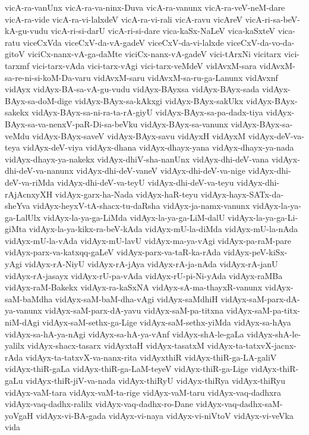 {vicA-ra-vanUnx
vicA-ra-va-ninx-Duva
vicA-ra-vanunx
vicA-ra-veV-neM-dare
vicA-ra-vide
vicA-ra-vi-lalxdeV
vicA-ra-vi-rali
vicA-ravu
vicAreV
vicA-ri-sa-beV-kA-gu-vudu
vicA-ri-si-darU
vicA-ri-si-dare
vica-kaSx-NaLeV
vica-kaSxteV
vica-ratu
viceCxVda
viceCxV-da-vA-gadeV
viceCxV-da-vi-lalxde
viceCxV-da-vo-da-gitoV
viciCx-nanx-vA-ga-daMte
viciCx-nanx-vA-gadeV
vici-tArxNi
vicitarx
vici-tarxmf
vici-tarx-vAda
vici-tarx-vAgi
vici-tarx-veMdeV
vidAvxM-sara
vidAvxM-sa-re-ni-si-koM-Da-varu
vidAvxM-saru
vidAvxM-sa-ru-ga-Lanunx
vidAvxnf
vidAyx
vidAyx-BA-sa-vA-gu-vudu
vidAyx-BAyxsa
vidAyx-BAyx-sada
vidAyx-BAyx-sa-doM-dige
vidAyx-BAyx-sa-kAkxgi
vidAyx-BAyx-sakUkx
vidAyx-BAyx-sakekx
vidAyx-BAyx-sa-ni-ra-ta-rA-giyU
vidAyx-BAyx-sa-pa-dadx-tiya
vidAyx-BAyx-sa-va-nenxV-paR-Di-sa-beVku
vidAyx-BAyx-sa-vanunx
vidAyx-BAyx-sa-veMdu
vidAyx-BAyx-saveV
vidAyx-BAyx-savu
vidAyxH
vidAyxM
vidAyx-deV-va-teya
vidAyx-deV-viya
vidAyx-dhana
vidAyx-dhayx-yana
vidAyx-dhayx-ya-nada
vidAyx-dhayx-ya-nakekx
vidAyx-dhiV-sha-nanUnx
vidAyx-dhi-deV-vana
vidAyx-dhi-deV-va-nanunx
vidAyx-dhi-deV-vaneV
vidAyx-dhi-deV-va-nige
vidAyx-dhi-deV-va-riMda
vidAyx-dhi-deV-va-teyU
vidAyx-dhi-deV-va-teyu
vidAyx-dhi-rAjAcnxyXH
vidAyx-garx-ha-Nada
vidAyx-haR-teyu
vidAyx-hayx-SATx-da-sheYva
vidAyx-heyxV-tA-shacx-tu-daRsha
vidAyx-ja-namx-vanunx
vidAyx-la-ya-ga-LalUlx
vidAyx-la-ya-ga-LiMda
vidAyx-la-ya-ga-LiM-dalU
vidAyx-la-ya-ga-Li-giMta
vidAyx-la-ya-kikx-ra-beV-kAda
vidAyx-mU-la-diMda
vidAyx-mU-la-nAda
vidAyx-mU-la-vAda
vidAyx-mU-lavU
vidAyx-ma-ya-vAgi
vidAyx-pa-raM-pare
vidAyx-parx-va-katxqq-gaLeV
vidAyx-parx-va-taR-ka-rAda
vidAyx-peV-kiSx-yAgi
vidAyx-rA-NiyU
vidAyx-rA-jAya
vidAyx-rA-ja-nAda
vidAyx-rA-janU
vidAyx-rA-jasayx
vidAyx-rU-pa-vAda
vidAyx-rU-pi-Ni-yAda
vidAyx-raMBa
vidAyx-raM-Bakekx
vidAyx-ra-kaSxNA
vidAyx-sA-ma-thayxR-vanunx
vidAyx-saM-baMdha
vidAyx-saM-baM-dha-vAgi
vidAyx-saMdhiH
vidAyx-saM-parx-dA-ya-vanunx
vidAyx-saM-parx-dA-yavu
vidAyx-saM-pa-titxna
vidAyx-saM-pa-titx-niM-dAgi
vidAyx-saM-sethx-ga-Lige
vidAyx-saM-sethx-yiMda
vidAyx-sa-hAya
vidAyx-sa-hA-ya-nAgi
vidAyx-sa-hA-ya-vAnf
vidAyx-shA-le-gaLa
vidAyx-shA-le-yalilx
vidAyx-shacx-tasarx
vidAyxtaH
vidAyx-tasatxM
vidAyx-ta-tatxvX-jacnx-rAda
vidAyx-ta-tatxvX-va-nanx-rita
vidAyxthiR
vidAyx-thiR-ga-LA-galiV
vidAyx-thiR-gaLa
vidAyx-thiR-ga-LaM-teyeV
vidAyx-thiR-ga-Lige
vidAyx-thiR-gaLu
vidAyx-thiR-jiV-va-nada
vidAyx-thiRyU
vidAyx-thiRya
vidAyx-thiRyu
vidAyx-vaM-tara
vidAyx-vaM-ta-rige
vidAyx-vaM-taru
vidAyx-vaq-dadhxra
vidAyx-vaq-dadhx-ralilx
vidAyx-vaq-dadhx-ro-Dane
vidAyx-vaq-dadhx-saM-yoVgaH
vidAyx-vi-BA-gada
vidAyx-vi-naya
vidAyx-vi-niVtoV
vidAyx-vi-veVka
vida
}
